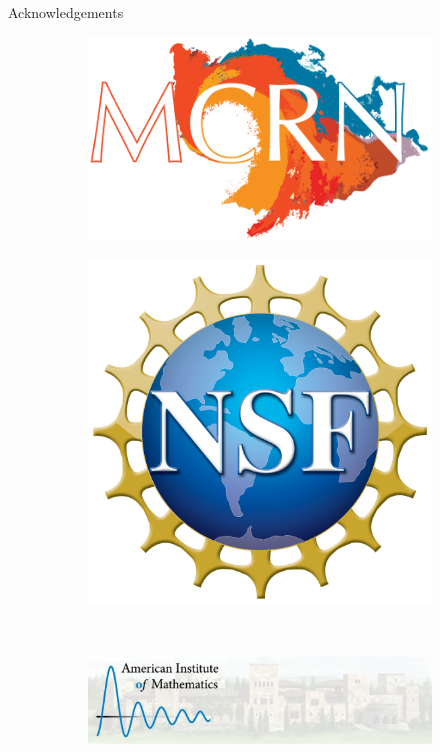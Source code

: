 \documentclass[aspectratio=169]{beamer}
\begin{document}
\begin{frame}{Acknowledgements}
\vfill
\begin{figure}
     \centering
     \begin{subfigure}[b]{0.45\textwidth}
         \centering
         \includegraphics[width=\textwidth]{figures/mcrn_logo.png}
     \end{subfigure}
     \hfill
     \begin{subfigure}[b]{0.3\textwidth}
         \centering
         \includegraphics[width=\textwidth]{figures/nsf_logo.png}
     \end{subfigure}
     \\
     \vspace*{1cm}
     \begin{subfigure}[b]{0.8\textwidth}
         \centering
         \includegraphics[width=\textwidth]{figures/aim_logo.jpg}
     \end{subfigure}
\end{figure}
\vfill
\end{frame}
\end{document}
